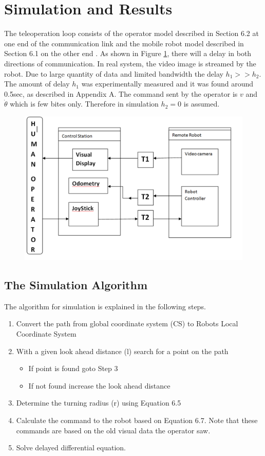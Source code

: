 \section{Simulation and Results }

The teleoperation loop consists of the operator model described in Section 6.2 at one end of the communication link and the mobile robot model described in Section 6.1 on the other end . As shown in Figure \ref{fig:teleloop}, there will a delay in both directions of communication. In real system, the video image is streamed  by the robot. Due to large quantity of data and limited bandwidth the delay $h_1>>h_2$. The amount of delay $h_1$ was experimentally measured  and it was found around 0.5sec, as described in Appendix A. The command sent by the operator is  $v$ and $\dot{\theta}$ which is few bites only.  Therefore in simulation  $h_2=0$ is assumed.

\begin{figure}
	\includegraphics[width=\linewidth,keepaspectratio]{Chapter6/fig/BlockTimeDelay}
	\label{fig:teleloop} 
\end{figure}


\subsection{The Simulation Algorithm} 
The algorithm for simulation is explained in the following steps.
\begin{enumerate}
\item Convert the path from global coordinate system (CS) to Robots Local Coordinate System
\item With a given look ahead distance (l) search for a point on the path
\begin{itemize}
\item If point is found goto Step 3
\item If not found increase the look ahead distance 
\end{itemize}
\item Determine the turning radius (r) using Equation 6.5
\item Calculate the command to the robot based on Equation 6.7. Note that these commands are based on the old visual data the operator saw.
\item Solve delayed  differential equation.
\end{enumerate}

